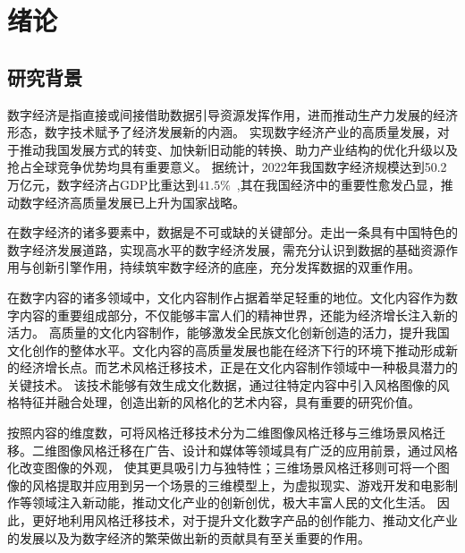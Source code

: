 \chapter{绪论}

\section{研究背景}
\indent
数字经济是指直接或间接借助数据引导资源发挥作用，进而推动生产力发展的经济形态，数字技术赋予了经济发展新的内涵。
实现数字经济产业的高质量发展，对于推动我国发展方式的转变、加快新旧动能的转换、助力产业结构的优化升级以及抢占全球竞争优势均具有重要意义。
据统计，2022年我国数字经济规模达到50.2万亿元，数字经济占GDP比重达到$41.5\%$~\cite{shuzijingjiReport},其在我国经济中的重要性愈发凸显，推动数字经济高质量发展已上升为国家战略。

在数字经济的诸多要素中，数据是不可或缺的关键部分。走出一条具有中国特色的数字经济发展道路，实现高水平的数字经济发展，需充分认识到数据的基础资源作用与创新引擎作用，持续筑牢数字经济的底座，充分发挥数据的双重作用。
\par 在数字内容的诸多领域中，文化内容制作占据着举足轻重的地位。文化内容作为数字内容的重要组成部分，不仅能够丰富人们的精神世界，还能为经济增长注入新的活力。
高质量的文化内容制作，能够激发全民族文化创新创造的活力，提升我国文化创作的整体水平。文化内容的高质量发展也能在经济下行的环境下推动形成新的经济增长点。而艺术风格迁移技术，正是在文化内容制作领域中一种极具潜力的关键技术。
该技术能够有效生成文化数据，通过往特定内容中引入风格图像的风格特征并融合处理，创造出新的风格化的艺术内容，具有重要的研究价值。
\par  按照内容的维度数，可将风格迁移技术分为二维图像风格迁移与三维场景风格迁移。二维图像风格迁移在广告、设计和媒体等领域具有广泛的应用前景，通过风格化改变图像的外观，
使其更具吸引力与独特性；三维场景风格迁移则可将一个图像的风格提取并应用到另一个场景的三维模型上，为虚拟现实、游戏开发和电影制作等领域注入新动能，推动文化产业的创新创优，极大丰富人民的文化生活。
因此，更好地利用风格迁移技术，对于提升文化数字产品的创作能力、推动文化产业的发展以及为数字经济的繁荣做出新的贡献具有至关重要的作用。


